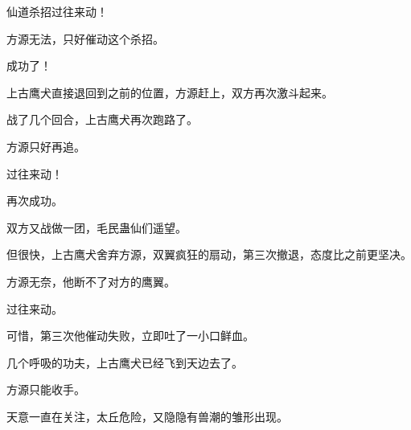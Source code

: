 \begin{this_body}
仙道杀招过往来动！

方源无法，只好催动这个杀招。

成功了！

上古鹰犬直接退回到之前的位置，方源赶上，双方再次激斗起来。

战了几个回合，上古鹰犬再次跑路了。

方源只好再追。

过往来动！

再次成功。

双方又战做一团，毛民蛊仙们遥望。

但很快，上古鹰犬舍弃方源，双翼疯狂的扇动，第三次撤退，态度比之前更坚决。

方源无奈，他断不了对方的鹰翼。

过往来动。

可惜，第三次他催动失败，立即吐了一小口鲜血。

几个呼吸的功夫，上古鹰犬已经飞到天边去了。

方源只能收手。

天意一直在关注，太丘危险，又隐隐有兽潮的雏形出现。

\end{this_body}

